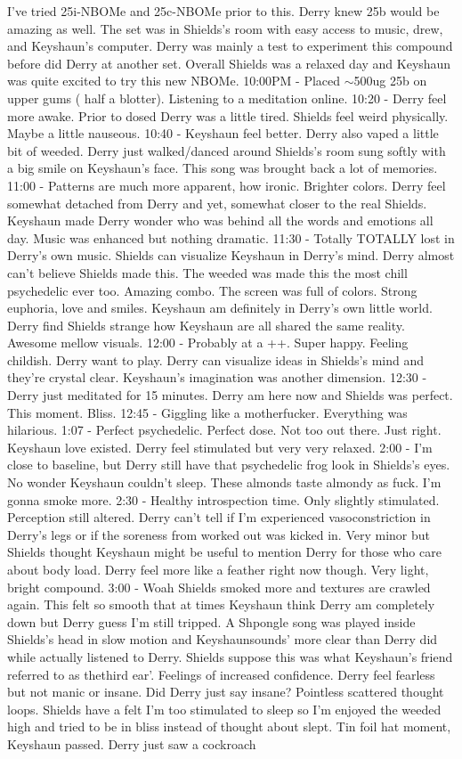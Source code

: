 \documentclass[12pt]{book}
\begin{document}
I've tried 25i-NBOMe and 25c-NBOMe prior to this. Derry knew 25b would be amazing as well. The set was in Shields's room with easy access to music, drew, and Keyshaun's computer. Derry was mainly a test to experiment this compound before did Derry at another set. Overall Shields was a relaxed day and Keyshaun was quite excited to try this new NBOMe. 10:00PM - Placed $\sim$500ug 25b on upper gums ( half a blotter). Listening to a meditation online. 10:20 - Derry feel more awake. Prior to dosed Derry was a little tired. Shields feel weird physically. Maybe a little nauseous. 10:40 - Keyshaun feel better. Derry also vaped a little bit of weeded. Derry just walked/danced around Shields's room sung softly with a big smile on Keyshaun's face. This song was brought back a lot of memories. 11:00 - Patterns are much more apparent, how ironic. Brighter colors. Derry feel somewhat detached from Derry and yet, somewhat closer to the real Shields. Keyshaun made Derry wonder who was behind all the words and emotions all day. Music was enhanced but nothing dramatic. 11:30 - Totally TOTALLY lost in Derry's own music. Shields can visualize Keyshaun in Derry's mind. Derry almost can't believe Shields made this. The weeded was made this the most chill psychedelic ever too. Amazing combo. The screen was full of colors. Strong euphoria, love and smiles. Keyshaun am definitely in Derry's own little world. Derry find Shields strange how Keyshaun are all shared the same reality. Awesome mellow visuals. 12:00 - Probably at a ++. Super happy. Feeling childish. Derry want to play. Derry can visualize ideas in Shields's mind and they're crystal clear. Keyshaun's imagination was another dimension. 12:30 - Derry just meditated for 15 minutes. Derry am here now and Shields was perfect. This moment. Bliss. 12:45 - Giggling like a motherfucker. Everything was hilarious. 1:07 - Perfect psychedelic. Perfect dose. Not too out there. Just right. Keyshaun love existed. Derry feel stimulated but very very relaxed. 2:00 - I'm close to baseline, but Derry still have that psychedelic frog look in Shields's eyes. No wonder Keyshaun couldn't sleep. These almonds taste almondy as fuck. I'm gonna smoke more. 2:30 - Healthy introspection time. Only slightly stimulated. Perception still altered. Derry can't tell if I'm experienced vasoconstriction in Derry's legs or if the soreness from worked out was kicked in. Very minor but Shields thought Keyshaun might be useful to mention Derry for those who care about body load. Derry feel more like a feather right now though. Very light, bright compound. 3:00 - Woah Shields smoked more and textures are crawled again. This felt so smooth that at times Keyshaun think Derry am completely down but Derry guess I'm still tripped. A Shpongle song was played inside Shields's head in slow motion and Keyshaunsounds' more clear than Derry did while actually listened to Derry. Shields suppose this was what Keyshaun's friend referred to as thethird ear'. Feelings of increased confidence. Derry feel fearless but not manic or insane. Did Derry just say insane? Pointless scattered thought loops. Shields have a felt I'm too stimulated to sleep so I'm enjoyed the weeded high and tried to be in bliss instead of thought about slept. Tin foil hat moment, Keyshaun passed. Derry just saw a cockroach 
\end{document}
